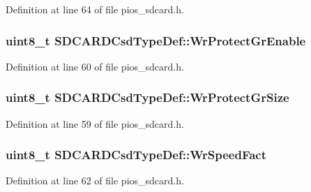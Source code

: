 \-Definition at line 64 of file pios\-\_\-sdcard.\-h.

\hypertarget{group___p_i_o_s___s_d_c_a_r_d_ga40ddea3e9a913588c57a8f922e929407}{
\subsubsection[{\-Wr\-Protect\-Gr\-Enable}]{\setlength{\rightskip}{0pt plus 5cm}uint8\-\_\-t {\bf \-S\-D\-C\-A\-R\-D\-Csd\-Type\-Def\-::\-Wr\-Protect\-Gr\-Enable}}}\label{group___p_i_o_s___s_d_c_a_r_d_ga40ddea3e9a913588c57a8f922e929407}


\-Definition at line 60 of file pios\-\_\-sdcard.\-h.

\hypertarget{group___p_i_o_s___s_d_c_a_r_d_ga6976b49fb75de7273c9ae54e5b4df865}{
\subsubsection[{\-Wr\-Protect\-Gr\-Size}]{\setlength{\rightskip}{0pt plus 5cm}uint8\-\_\-t {\bf \-S\-D\-C\-A\-R\-D\-Csd\-Type\-Def\-::\-Wr\-Protect\-Gr\-Size}}}\label{group___p_i_o_s___s_d_c_a_r_d_ga6976b49fb75de7273c9ae54e5b4df865}


\-Definition at line 59 of file pios\-\_\-sdcard.\-h.

\hypertarget{group___p_i_o_s___s_d_c_a_r_d_gad518a80289b8949800c8f7e50fc4b21f}{
\subsubsection[{\-Wr\-Speed\-Fact}]{\setlength{\rightskip}{0pt plus 5cm}uint8\-\_\-t {\bf \-S\-D\-C\-A\-R\-D\-Csd\-Type\-Def\-::\-Wr\-Speed\-Fact}}}\label{group___p_i_o_s___s_d_c_a_r_d_gad518a80289b8949800c8f7e50fc4b21f}


\-Definition at line 62 of file pios\-\_\-sdcard.\-h.

